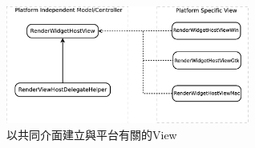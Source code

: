 \documentclass[10pt, twocolumn]{article}
\begin{document}
\begin{figure}
\begin{center}
\includegraphics[width=8cm]{chromium-mvc.eps}
\caption{以共同介面建立與平台有關的View}
\label{chromium-mvc}
\end{center}
\end{figure}

\end{document}

